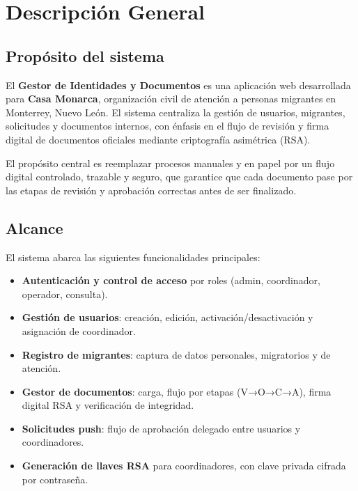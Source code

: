 \documentclass[10pt,letterpaper]{report}
\begin{document}
\tableofcontents
\listoftables
\listoffigures
\clearpage
{}

\chapter{Descripción General}

\section{Propósito del sistema}

El \textbf{Gestor de Identidades y Documentos} es una aplicación web desarrollada para \textbf{Casa Monarca}, organización civil de atención a personas migrantes en Monterrey, Nuevo León. El sistema centraliza la gestión de usuarios, migrantes, solicitudes y documentos internos, con énfasis en el flujo de revisión y firma digital de documentos oficiales mediante criptografía asimétrica (RSA).

El propósito central es reemplazar procesos manuales y en papel por un flujo digital controlado, trazable y seguro, que garantice que cada documento pase por las etapas de revisión y aprobación correctas antes de ser finalizado.

\section{Alcance}

El sistema abarca las siguientes funcionalidades principales:

\begin{itemize}
  \item \textbf{Autenticación y control de acceso} por roles (admin, coordinador, operador, consulta).
  \item \textbf{Gestión de usuarios}: creación, edición, activación/desactivación y asignación de coordinador.
  \item \textbf{Registro de migrantes}: captura de datos personales, migratorios y de atención.
  \item \textbf{Gestor de documentos}: carga, flujo por etapas (V→O→C→A), firma digital RSA y verificación de integridad.
  \item \textbf{Solicitudes push}: flujo de aprobación delegado entre usuarios y coordinadores.
  \item \textbf{Generación de llaves RSA} para coordinadores, con clave privada cifrada por contraseña.
\end{itemize}
\end{document}

